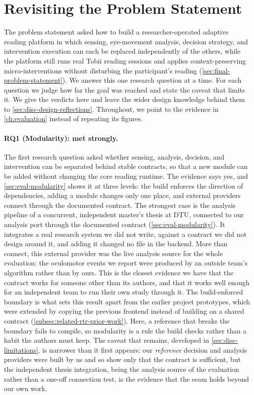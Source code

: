 \section{Revisiting the Problem Statement}
\label{sec:disc-problem-statement}

The problem statement asked how to build a researcher-operated adaptive reading platform in which sensing, eye-movement analysis, decision strategy, and intervention execution can each be replaced independently of the others, while the platform still runs real Tobii reading sessions and applies context-preserving micro-interventions without disturbing the participant's reading (\cref{sec:final-problem-statement}).
We answer this one research question at a time.
For each question we judge how far the goal was reached and state the caveat that limits it.
We give the verdicts here and leave the wider design knowledge behind them to \cref{sec:disc-design-reflections}.
Throughout, we point to the evidence in \cref{ch:evaluation} instead of repeating its figures.

\paragraph{RQ1 (Modularity): met strongly.}
The first research question asked whether sensing, analysis, decision, and intervention can be separated behind stable contracts, so that a new module can be added without changing the core reading runtime.
The evidence says yes, and \cref{sec:eval-modularity} shows it at three levels: the build enforces the direction of dependencies, adding a module changes only one place, and external providers connect through the documented contract.
The strongest case is the analysis pipeline of a concurrent, independent master's thesis at DTU, connected to our analysis port through the documented contract (\cref{sec:eval-modularity}).
It integrates a real research system we did not write, against a contract we did not design around it, and adding it changed no file in the backend.
More than connect, this external provider was the live analysis source for the whole evaluation: the oculomotor events we report were produced by an outside team's algorithm rather than by ours.
This is the closest evidence we have that the contract works for someone other than its authors, and that it works well enough for an independent team to run their own study through it.
The build-enforced boundary is what sets this result apart from the earlier project prototypes, which were extended by copying the previous frontend instead of building on a shared contract (\cref{subsec:related-rtr-prior-work}).
Here, a reference that breaks the boundary fails to compile, so modularity is a rule the build checks rather than a habit the authors must keep.
The caveat that remains, developed in \cref{sec:disc-limitations}, is narrower than it first appears: our \emph{reference} decision and analysis providers were built by us and so show only that the contract is sufficient, but the independent thesis integration, being the analysis source of the evaluation rather than a one-off connection test, is the evidence that the seam holds beyond our own work.

